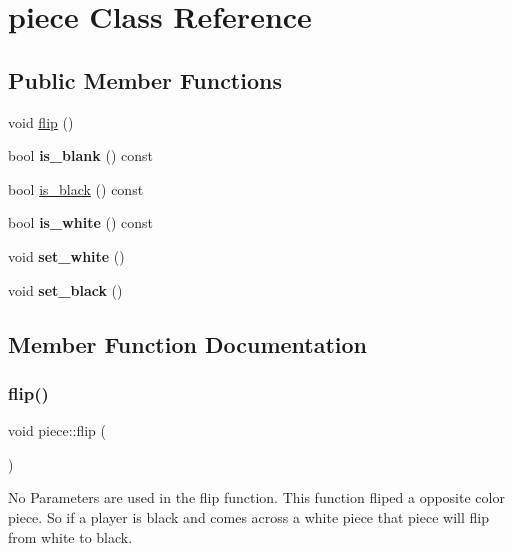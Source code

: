 \hypertarget{classpiece}{}\section{piece Class Reference}
\label{classpiece}
\subsection*{Public Member Functions}
\begin{DoxyCompactItemize}
\item 
void \mbox{\hyperlink{classpiece_ab898c5827a5859e4cddc9d61a814a873}{flip}} ()
\item 
\mbox{\label{classpiece_aa1eda7729e0f3383a813fc6ccc4e7e3c}} 
bool {\bfseries is\+\_\+blank} () const
\item 
bool \mbox{\hyperlink{classpiece_a103dccd216cb495d1c42b2465778be53}{is\+\_\+black}} () const
\item 
\mbox{\label{classpiece_ae9dde29687fcb2b7badc6cb5395a13f2}} 
bool {\bfseries is\+\_\+white} () const
\item 
\mbox{\label{classpiece_a31480899f2a591fdb22d97933303e19d}} 
void {\bfseries set\+\_\+white} ()
\item 
\mbox{\label{classpiece_a273d63d07b6ea973b2fc4f7e1b56ea10}} 
void {\bfseries set\+\_\+black} ()
\end{DoxyCompactItemize}


\subsection{Member Function Documentation}
\mbox{\label{classpiece_ab898c5827a5859e4cddc9d61a814a873}} 
\subsubsection{\texorpdfstring{flip()}{flip()}}
{\footnotesize\ttfamily void piece\+::flip (\begin{DoxyParamCaption}{ }\end{DoxyParamCaption})\hspace{0.3cm}{\ttfamily [inline]}}

No Parameters are used in the flip function. This function fliped a opposite color piece. So if a player is black and comes across a white piece that piece will flip from white to black. \mbox{\label{classpiece_a103dccd216cb495d1c42b2465778be53}} 
